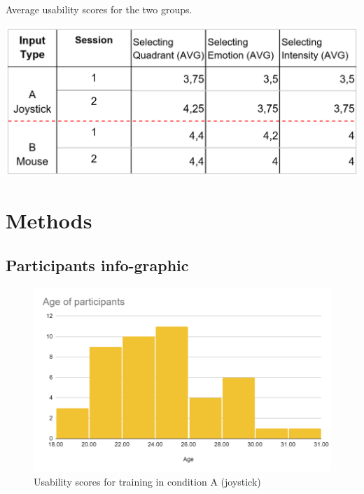 \begin{table}[!htb]
  \caption{Average usability scores for the two groups.}
  \label{tbl:table_usability__scores}
  \includegraphics[width=\linewidth]{img/appendix/table_usability_scores.png}
\end{table}

\section{Methods}
\label{sec:appendix_A2}

\subsection{Participants info-graphic}
\label{sec:appendix_A2.1}
\begin{figure}[!htb]
\includegraphics[width=14cm]{img/appendix/age_distribution.png}
\centering
\caption{Usability scores for training in condition A (joystick)}\label{fig:usbility_condition_B}
\end{figure}


